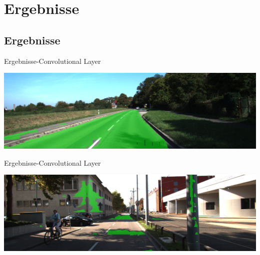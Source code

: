 \section{Ergebnisse}

\subsection{Ergebnisse}

\begin{frame}{Ergebnisse-Convolutional Layer}
\begin{center}
    \includegraphics[scale=0.25]{../images/Convolutional/um_000014+-overlay-fully-49-patch.png}
    \end{center}
\end{frame}

 \begin{frame}{Ergebnisse-Convolutional Layer}
	 \begin{center}
    \includegraphics[scale=0.25]{../images/Convolutional/um_000066-overlay-fully-49-patch.png}
        \end{center}
 \end{frame}


